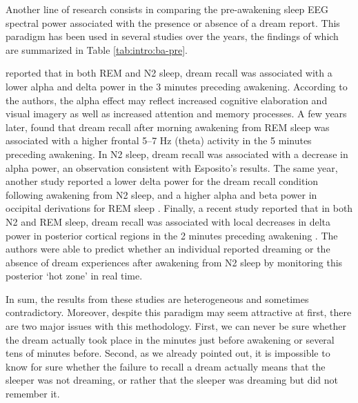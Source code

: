 Another line of research consists in comparing the pre-awakening sleep EEG spectral power associated with the presence or absence of a dream report. This paradigm has been used in several studies over the years, the findings of which are summarized in Table \ref{tab:intro:ba-pre}.

\citet{esposito_reduced_2004} reported that in both REM and N2 sleep, dream recall was associated with a lower alpha and delta power in the 3 minutes preceding awakening. According to the authors, the alpha effect may reflect increased cognitive elaboration and visual imagery as well as increased attention and memory processes. A few years later, \citet{marzano_recalling_2011} found that dream recall after morning awakening from REM sleep was associated with a higher frontal 5–7 Hz (theta) activity in the 5 minutes preceding awakening. In N2 sleep, dream recall was associated with a decrease in alpha power, an observation consistent with Esposito’s results. The same year, another study reported a lower delta power for the dream recall condition following awakening from N2 sleep, and a higher alpha and beta power in occipital derivations for REM sleep \citep{chellappa_cortical_2011}. Finally, a recent study reported that in both N2 and REM sleep, dream recall was associated with local decreases in delta power in posterior cortical regions in the 2 minutes preceding awakening \citep{siclari_neural_2017}. The authors were able to predict whether an individual reported dreaming or the absence of dream experiences after awakening from N2 sleep by monitoring this posterior ‘hot zone’ in real time.

In sum, the results from these studies are heterogeneous and sometimes contradictory. Moreover, despite this paradigm may seem attractive at first, there are two major issues with this methodology. First, we can never be sure whether the dream actually took place in the minutes just before awakening or several tens of minutes before. Second, as we already pointed out, it is impossible to know for sure whether the failure to recall a dream actually means that the sleeper was not dreaming, or rather that the sleeper was dreaming but did not remember it.

